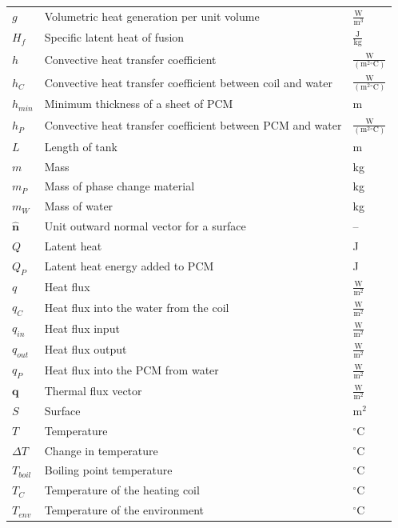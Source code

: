 \documentclass[12pt]{article}
\begin{document}
\begin{longtabu}{l X[l] l}
\\
$g$ & Volumetric heat generation per unit volume & $\frac{\text{W}}{\text{m}^{3}}$
\\
${H_{f}}$ & Specific latent heat of fusion & $\frac{\text{J}}{\text{kg}}$
\\
$h$ & Convective heat transfer coefficient & $\frac{\text{W}}{(\text{m}^{2}{}^{\circ}\text{C})}$
\\
${h_{C}}$ & Convective heat transfer coefficient between coil and water & $\frac{\text{W}}{(\text{m}^{2}{}^{\circ}\text{C})}$
\\
${h_{min}}$ & Minimum thickness of a sheet of PCM & m
\\
${h_{P}}$ & Convective heat transfer coefficient between PCM and water & $\frac{\text{W}}{(\text{m}^{2}{}^{\circ}\text{C})}$
\\
$L$ & Length of tank & m
\\
$m$ & Mass & kg
\\
${m_{P}}$ & Mass of phase change material & kg
\\
${m_{W}}$ & Mass of water & kg
\\
$\mathbf{\hat{n}}$ & Unit outward normal vector for a surface & --
\\
$Q$ & Latent heat & J
\\
${Q_{P}}$ & Latent heat energy added to PCM & J
\\
$q$ & Heat flux & $\frac{\text{W}}{\text{m}^{2}}$
\\
${q_{C}}$ & Heat flux into the water from the coil & $\frac{\text{W}}{\text{m}^{2}}$
\\
${q_{in}}$ & Heat flux input & $\frac{\text{W}}{\text{m}^{2}}$
\\
${q_{out}}$ & Heat flux output & $\frac{\text{W}}{\text{m}^{2}}$
\\
${q_{P}}$ & Heat flux into the PCM from water & $\frac{\text{W}}{\text{m}^{2}}$
\\
$\mathbf{q}$ & Thermal flux vector & $\frac{\text{W}}{\text{m}^{2}}$
\\
$S$ & Surface & $\text{m}^{2}$
\\
$T$ & Temperature & ${}^{\circ}$C
\\
$ΔT$ & Change in temperature & ${}^{\circ}$C
\\
${T_{boil}}$ & Boiling point temperature & ${}^{\circ}$C
\\
${T_{C}}$ & Temperature of the heating coil & ${}^{\circ}$C
\\
${T_{env}}$ & Temperature of the environment & ${}^{\circ}$C
\\

\end{longtabu}
\end{document}
